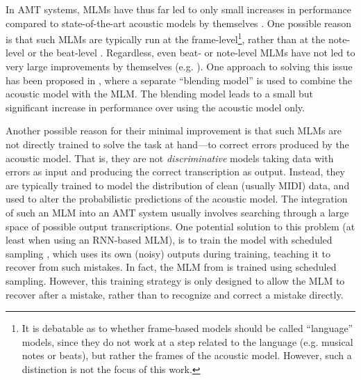 \documentclass{article}
\begin{document}
In AMT systems, MLMs have thus far led to only small increases in performance compared to state-of-the-art acoustic models by themselves \cite{Kelz2016}. One possible reason is that such MLMs are typically run at the frame-level\footnote{It is debatable as to whether frame-based models should be called ``language'' models, since they do not work at a step related to the language (e.g. musical notes or beats), but rather the frames of the acoustic model. However, such a distinction is not the focus of this work.}, rather than at the note-level or the beat-level \cite{Ycart2017}. Regardless, even beat- or note-level MLMs have not led to very large improvements by themselves (e.g. \cite{app8030470, ycart2018polyphonic}). One approach to solving this issue has been proposed in \cite{McLeod:19b}, where a separate ``blending model'' is used to combine the acoustic model with the MLM. The blending model leads to a small but significant increase in performance over using the acoustic model only.

Another possible reason for their minimal improvement is that such MLMs are not directly trained to solve the task at hand---to correct errors produced by the acoustic model. That is, they are not \textit{discriminative} models taking data with errors as input and producing the correct transcription as output. Instead, they are typically trained to model the distribution of clean (usually MIDI) data, and used to alter the probabilistic predictions of the acoustic model. The integration of such an MLM into an AMT system usually involves searching through a large space of possible output transcriptions. One potential solution to this problem (at least when using an RNN-based MLM), is to train the model with scheduled sampling \cite{Bengio2015}, which uses its own (noisy) outputs during training, teaching it to recover from such mistakes. In fact, the MLM from \cite{McLeod:19b} is trained using scheduled sampling. However, this training strategy is only designed to allow the MLM to recover after a mistake, rather than to recognize and correct a mistake directly.
\end{document}
